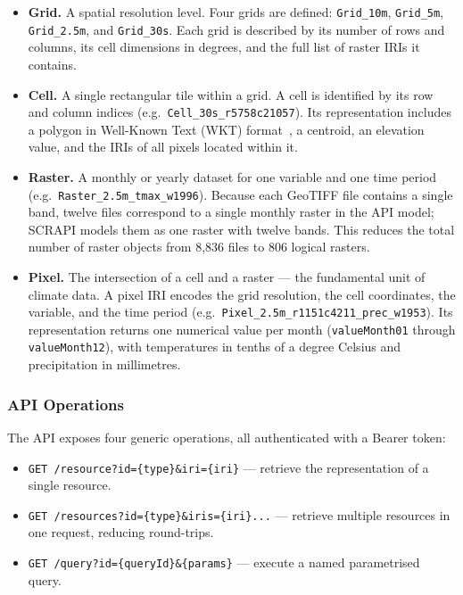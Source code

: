 \begin{itemize}
  \item \textbf{Grid.} A spatial resolution level. Four grids are defined:
    \texttt{Grid\_10m}, \texttt{Grid\_5m}, \texttt{Grid\_2.5m}, and
    \texttt{Grid\_30s}. Each grid is described by its number of rows and
    columns, its cell dimensions in degrees, and the full list of raster IRIs
    it contains.

  \item \textbf{Cell.} A single rectangular tile within a grid. A cell is
    identified by its row and column indices (e.g.\
    \texttt{Cell\_30s\_r5758c21057}). Its representation includes a polygon in 
    Well-Known Text (WKT) format~\cite{ogc_wkt}, a centroid, an elevation value, 
    and the IRIs of all pixels located within it.

  \item \textbf{Raster.} A monthly or yearly dataset for one variable and one
    time period (e.g.\ \texttt{Raster\_2.5m\_tmax\_w1996}). Because each
    GeoTIFF file contains a single band, twelve files correspond to a single
    monthly raster in the API model; SCRAPI models them as one raster with
    twelve bands. This reduces the total number of raster objects from 8,836
    files to 806 logical rasters.

  \item \textbf{Pixel.} The intersection of a cell and a raster --- the
    fundamental unit of climate data. A pixel IRI encodes the grid resolution,
    the cell coordinates, the variable, and the time period (e.g.\
    \texttt{Pixel\_2.5m\_r1151c4211\_prec\_w1953}). Its representation returns
    one numerical value per month (\texttt{valueMonth01} through
    \texttt{valueMonth12}), with temperatures in tenths of a degree Celsius and
    precipitation in millimetres.
\end{itemize}

\subsubsection{API Operations}\label{REL_WORLDCLIM_API_OPS}

The API exposes four generic operations, all authenticated with a Bearer token:

\begin{itemize}
  \item \texttt{GET /resource?id=\{type\}\&iri=\{iri\}} --- retrieve the
    representation of a single resource.
  \item \texttt{GET /resources?id=\{type\}\&iris=\{iri\}...} --- retrieve
    multiple resources in one request, reducing round-trips.
  \item \texttt{GET /query?id=\{queryId\}\&\{params\}} --- execute a named
    parametrised query.
\end{itemize}

